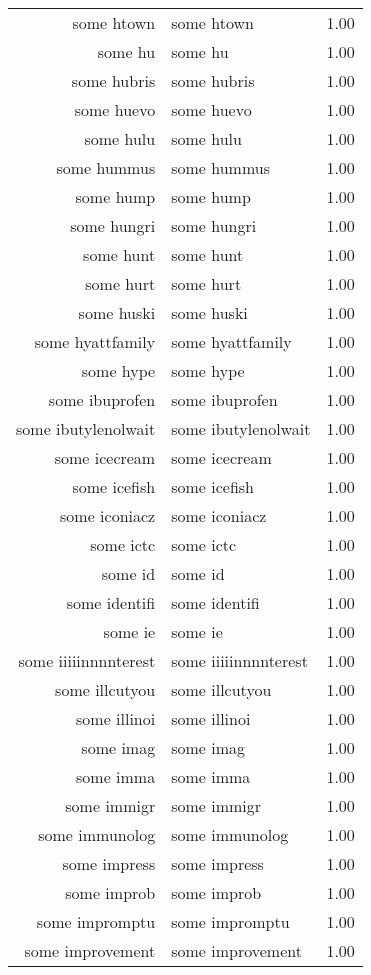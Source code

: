 \begin{table}[ht]
\begin{tabular}{rlr}
  some htown & some htown & 1.00 \\ 
  some hu & some hu & 1.00 \\ 
  some hubris & some hubris & 1.00 \\ 
  some huevo & some huevo & 1.00 \\ 
  some hulu & some hulu & 1.00 \\ 
  some hummus & some hummus & 1.00 \\ 
  some hump & some hump & 1.00 \\ 
  some hungri & some hungri & 1.00 \\ 
  some hunt & some hunt & 1.00 \\ 
  some hurt & some hurt & 1.00 \\ 
  some huski & some huski & 1.00 \\ 
  some hyattfamily & some hyattfamily & 1.00 \\ 
  some hype & some hype & 1.00 \\ 
  some ibuprofen & some ibuprofen & 1.00 \\ 
  some ibutylenolwait & some ibutylenolwait & 1.00 \\ 
  some icecream & some icecream & 1.00 \\ 
  some icefish & some icefish & 1.00 \\ 
  some iconiacz & some iconiacz & 1.00 \\ 
  some ictc & some ictc & 1.00 \\ 
  some id & some id & 1.00 \\ 
  some identifi & some identifi & 1.00 \\ 
  some ie & some ie & 1.00 \\ 
  some iiiiinnnnterest & some iiiiinnnnterest & 1.00 \\ 
  some illcutyou & some illcutyou & 1.00 \\ 
  some illinoi & some illinoi & 1.00 \\ 
  some imag & some imag & 1.00 \\ 
  some imma & some imma & 1.00 \\ 
  some immigr & some immigr & 1.00 \\ 
  some immunolog & some immunolog & 1.00 \\ 
  some impress & some impress & 1.00 \\ 
  some improb & some improb & 1.00 \\ 
  some impromptu & some impromptu & 1.00 \\ 
  some improvement & some improvement & 1.00 \\ 

\end{tabular}
\end{table}
